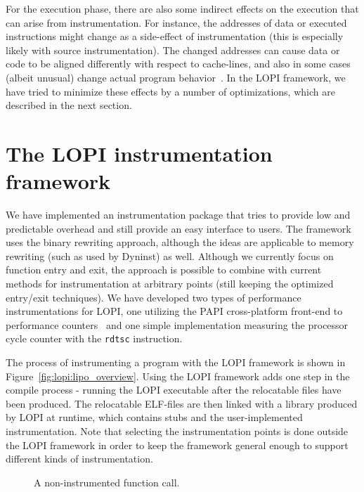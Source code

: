 For the execution phase, there are also some indirect effects on the execution
that can arise from instrumentation. For instance, the addresses of data or
executed instructions might change as a side-effect of instrumentation (this
is especially likely with source instrumentation). The changed addresses can
cause data or code to be aligned differently with respect to cache-lines, and
also in some cases (albeit unusual) change actual program
behavior~\cite{moseley2003checking}. In the LOPI framework, we have tried to
minimize these effects by a number of optimizations, which are described in the
next section.

\section{The LOPI instrumentation framework}
\label{sec:lopi:lopi}
We have implemented an instrumentation package that tries to provide low and
predictable overhead and still provide an easy interface to users.  The
framework uses the binary rewriting approach, although the ideas are
applicable to memory rewriting (such as used by Dyninst) as well. Although we
currently focus on function entry and exit, the approach is possible to
combine with current methods for instrumentation at arbitrary points (still
keeping the optimized entry/exit techniques). We have developed two types of
performance instrumentations for LOPI, one utilizing the PAPI cross-platform
front-end to performance counters~\cite{london2001papi} and one simple
implementation measuring the processor cycle counter with the \texttt{rdtsc}
instruction.


The process of instrumenting a program with the LOPI framework is shown in
Figure~\ref{fig:lopi:lipo_overview}. Using the LOPI framework adds one step in the
compile process - running the LOPI executable after the relocatable files have
been produced. The relocatable ELF-files are then linked with a library
produced by LOPI at runtime, which contains stubs and the user-implemented
instrumentation. Note that selecting the instrumentation points is done
outside the LOPI framework in order to keep the framework general enough to
support different kinds of instrumentation.

\begin{figure*}[htb]
  \begin{center}
  \end{center}
  \caption{A non-instrumented function call.}
  \label{fig:lopi:non_inst_call}
\end{figure*}

